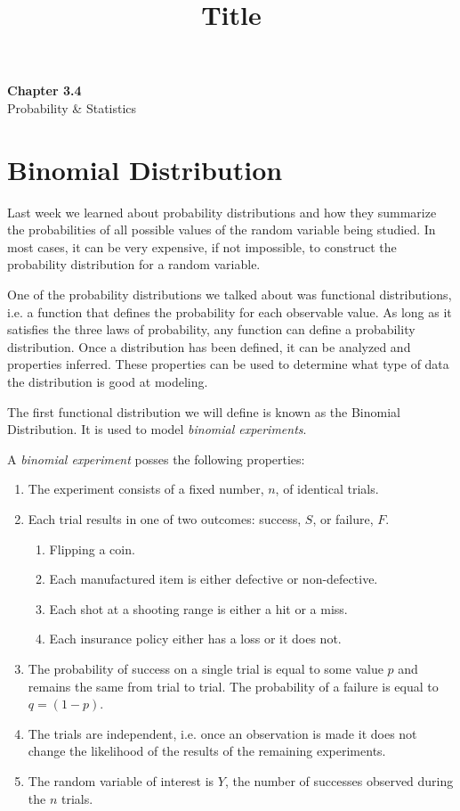\documentclass[11pt]{article}
\theoremstyle{definition}
\begin{document}
\title{Title}

\thispagestyle{empty}

\begin{center}
{\LARGE \bf Chapter 3.4}\\
{\large Probability \& Statistics}
\end{center}

\section{Binomial Distribution}

Last week we learned about probability distributions and how they summarize the probabilities of all possible values of the random variable being studied. In most cases, it can be very expensive, if not impossible, to construct the probability distribution for a random variable.

One of the probability distributions we talked about was functional distributions, i.e. a function that defines the probability for each observable value. As long as it satisfies the three laws of probability, any function can define a probability distribution. Once a distribution has been defined, it can be analyzed and properties inferred. These properties can be used to determine what type of data the distribution is good at modeling.

The first functional distribution we will define is known as the Binomial Distribution. It is used to model \textit{binomial experiments}.

\begin{shaded}
	A \textit{binomial experiment} posses the following properties:
	\begin{enumerate}
		\item The experiment consists of a fixed number, $n$, of identical trials.
		\item Each trial results in one of two outcomes: success, $S$, or failure, $F$.
		\begin{enumerate}
			\item Flipping a coin.
			\item Each manufactured item is either defective or non-defective.
			\item Each shot at a shooting range is either a hit or a miss.
			\item Each insurance policy either has a loss or it does not.
		\end{enumerate}
		\item The probability of success on a single trial is equal to some value $p$ and remains the same from trial to trial. The probability of a failure is equal to $q = (1-p)$.
		\item The trials are independent, i.e. once an observation is made it does not change the likelihood of the results of the remaining experiments.
		\item The random variable of interest is $Y$, the number of successes observed during the $n$ trials.
	\end{enumerate}
\end{shaded}
\end{document}
